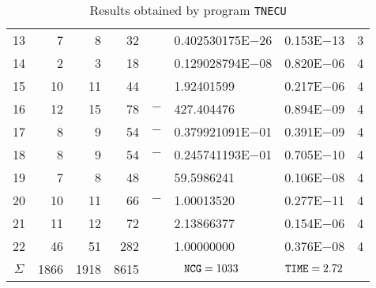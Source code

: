 \documentclass{esub2acm}
\begin{document}
\begin{table}
\begin{tabular}{c|rrrr@{}lcc}
13  &   7   &   8   &   32  &       &   0.402530175E$-$26   &   0.153E$-$13 &   3   \\
14  &   2   &   3   &   18  &       &   0.129028794E$-$08   &   0.820E$-$06 &   4   \\
15  &   10  &   11  &   44  &       &   1.92401599  &   0.217E$-$06 &   4   \\
16  &   12  &   15  &   78  &   $-$ &   427.404476  &   0.894E$-$09 &   4   \\
17  &   8   &   9   &   54  &   $-$ &   0.379921091E$-$01   &   0.391E$-$09 &   4   \\
18  &   8   &   9   &   54  &   $-$ &   0.245741193E$-$01   &   0.705E$-$10 &   4   \\
19  &   7   &   8   &   48  &       &   59.5986241  &   0.106E$-$08 &   4   \\
20  &   10  &   11  &   66  &   $-$ &   1.00013520  &   0.277E$-$11 &   4   \\
21  &   11  &   12  &   72  &       &   2.13866377  &   0.154E$-$06 &   4   \\
22  &   46  &   51  &   282 &       &   1.00000000  &
0.376E$-$08 &   4   \\ \hline $\Sigma$\rule[-2pt]{0pt}{12pt}  &
1866    &   1918    &   8615    &   \multicolumn{2}{c}{${\tt NCG}
= 1033$} &   ${\tt TIME} = 2.72$ &  \\ \hline
\end{tabular}
\caption{Results obtained by program {\tt TNECU}} \label{tnecu}
\end{table}
\end{document}
